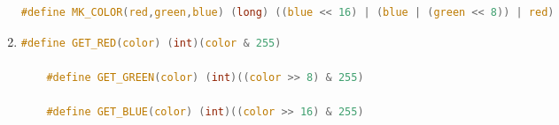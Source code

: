 \documentclass[12pt]{article}
\begin{document}
\begin{enumerate}[1.]
\begin{lstlisting}[language=c]
    #define MK_COLOR(red,green,blue) (long) ((blue << 16) | (blue | (green << 8)) | red)
\end{lstlisting}

    \item

\begin{lstlisting}[language=c]
    #define GET_RED(color) (int)(color & 255)

    #define GET_GREEN(color) (int)((color >> 8) & 255)

    #define GET_BLUE(color) (int)((color >> 16) & 255)
\end{lstlisting}

\end{enumerate}
\end{document}
